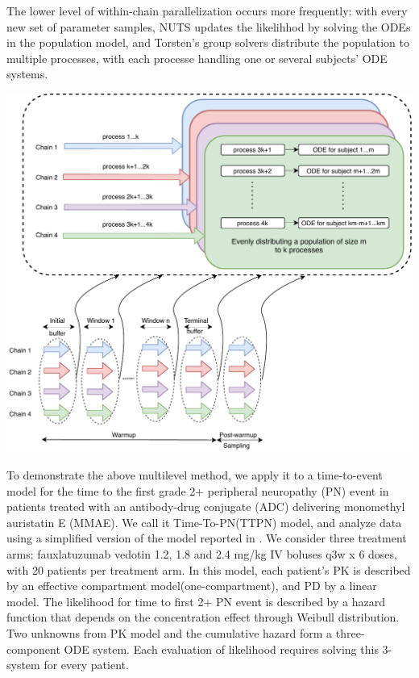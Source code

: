 \documentclass[landscape,a0paper,fontscale=0.5]{baposter} %
\begin{document}
\begin{poster}
{\begin{multicols}{2}
The lower level of within-chain parallelization occurs more
frequently: with every new set of parameter samples, NUTS updates the likelihhod
by solving the ODEs in the population model, and Torsten's group
solvers distribute the population to multiple processes, with each
processe handling one or several subjects' ODE systems.

\begin{center}
\includegraphics[width=\linewidth]{./figure/within_chain_parallel_diagram.pdf}
\end{center}

To demonstrate the above multilevel method, we apply it to a
time-to-event model for the time to the first grade 2+ peripheral neuropathy (PN)
event in patients treated with an antibody-drug conjugate (ADC)
delivering monomethyl auristatin E (MMAE). We call it
Time-To-PN(TTPN) model, and analyze data using a
simplified version of the model reported in
\cite{lu_time--event_2017}. We consider three treatment arms:
fauxlatuzumab vedotin 1.2, 1.8 and 2.4 mg/kg IV boluses q3w x 6 doses,
with 20 patients per treatment arm. In this model,
each patient's PK is described by an effective compartment model(one-compartment),
and PD by a linear model. The likelihood for time to first 2+ PN event
is described by a hazard function that depends on the concentration
effect through Weibull distribution. Two unknowns from
PK model and the cumulative hazard form a three-component
ODE system. Each evaluation of likelihood requires solving this
3-system for every patient. 


\end{multicols}}
\end{poster}
\end{document}
